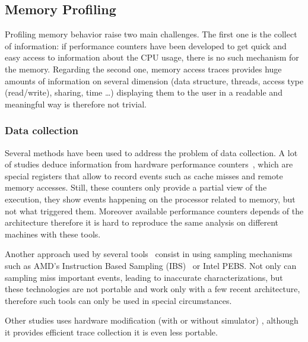 %

\subsection{Memory Profiling}
\label{sec:soa-profiling}

Profiling memory behavior raise two main challenges. The first one is the
collect of
information: if performance counters have been developed to get quick and
easy access to information about the CPU usage, there is no such mechanism for
the memory. Regarding the second one, memory access traces provides huge amounts of information
on several dimension (data structure, threads, access type (read/write),
sharing, time \ldots) displaying them to the user in a readable and meaningful
way is therefore not trivial.

\subsubsection{Data collection}

Several methods have been used to address the problem of data collection. A
lot of studies deduce information from hardware performance
counters~\cite{Majo13(Mis)understanding,
Jiang14Understanding,Bosch00Rivet,Weyers14Visualization,Tao01Visualizing,DeRose01Hardware},
which are special registers that allow to record events such as cache misses and remote
memory accesses. Still, these counters only provide a partial
view of the execution, they show events happening on the processor related to
memory, but not what triggered them. Moreover available performance counters
depends of the architecture therefore it is hard to reproduce the same
analysis on different machines with these tools.


Another approach used by several
tools~\cite{Lachaize12MemProf,McCurdy2010,Liu14Tool,Gimenez14Dissecting}
consist in using sampling mechanisms such as AMD's Instruction Based Sampling
(IBS)~\cite{Drongowski07Instructionbased} or Intel PEBS. Not only can sampling miss important events, leading to
inaccurate characterizations, but these technologies are not portable and work
only with a few recent architecture, therefore such tools can only be used in
special circumstances.

Other studies uses hardware modification (with or without simulator)
\cite{Bao08HMTT,Martonosi92MemSpy}, although it provides efficient trace
collection it is even less portable.



